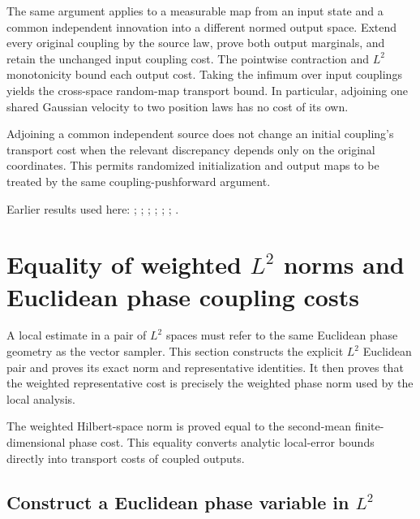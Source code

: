 \documentclass[11pt,a4paper]{report}
\begin{document}
The same argument applies to a measurable map from an input state and a common independent innovation into a different normed output space. Extend every original coupling by the source law, prove both output marginals, and retain the unchanged input coupling cost. The pointwise contraction and \(L^{2}\) monotonicity bound each output cost. Taking the infimum over input couplings yields the cross-space random-map transport bound. In particular, adjoining one shared Gaussian velocity to two position laws has no cost of its own.



Adjoining a common independent source does not change an initial coupling’s transport cost when the relevant discrepancy depends only on the original coordinates. This permits randomized initialization and output maps to be treated by the same coupling-pushforward argument.



Earlier results used here: \cite[Section~3.17.1]{LangevinLean2026ULASC}; \cite[Section~3.17.2]{LangevinLean2026ULASC}; \cite[Section~3.17.3]{LangevinLean2026ULASC}; \cite[Section~3.17.9]{LangevinLean2026ULASC}; \cite[Section~3.22.10]{LangevinLean2026ULASC}; \cite[Section~3.22.15]{LangevinLean2026ULASC}; \cite[Section~3.22.2]{LangevinLean2026ULASC}.
\section{\texorpdfstring{Equality of weighted \(L^{2}\) norms and Euclidean phase coupling costs}{Equality of weighted L² norms and Euclidean phase coupling costs}}
\label{proof-module-KineticLangevin-LpWeightedGeometry-lean}


A local estimate in a pair of \(L^{2}\) spaces must refer to the same Euclidean phase geometry as the vector sampler. This section constructs the explicit \(L^{2}\) Euclidean pair and proves its exact norm and representative identities. It then proves that the weighted representative cost is precisely the weighted phase norm used by the local analysis.



The weighted Hilbert-space norm is proved equal to the second-mean finite-dimensional phase cost. This equality converts analytic local-error bounds directly into transport costs of coupled outputs.

\subsection{\texorpdfstring{Construct a Euclidean phase variable in \(L^{2}\)}{Construct a Euclidean phase variable in L²}}
\label{report-step-KineticLangevin-LpWeightedGeometry-lean-1}
\end{document}
